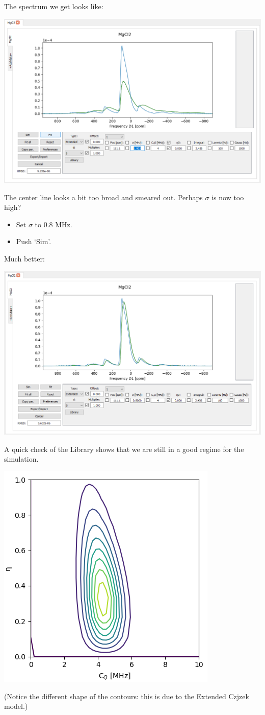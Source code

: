\documentclass[11pt,a4paper]{article}
\begin{document}
The spectrum we get looks like:
\begin{center}
\includegraphics[width=0.8\linewidth]{Figs/fig9.PNG}
\end{center}
The center line looks a bit too broad and smeared out. Perhaps $\sigma$ is now too high?
\begin{itemize}
  \item Set $\sigma$ to 0.8 MHz.
  \item Push `Sim'.
\end{itemize}
Much better:
\begin{center}
\includegraphics[width=0.8\linewidth]{Figs/fig10.PNG}
\end{center}
A quick check of the Library shows that we are still in a good regime for the simulation.
\begin{center}
\includegraphics[width=0.5\linewidth]{Figs/fig11.PNG}
\end{center}
(Notice the different shape of the contours: this is due to the Extended Czjzek model.)
\end{document}
